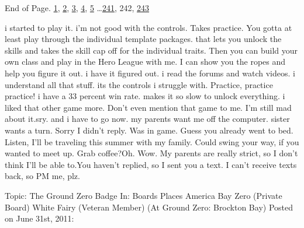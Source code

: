 End of Page.   \underline{1}, \underline{2}, \underline{3}, \underline{4}, \underline{5} \ldots \underline{241}, 242, \underline{243}



\sectionbreak






 i started to play it. i'm not good with the controls. Takes practice.  You gotta at least play through the individual template packages.  that lets you unlock the skills and takes the skill cap off for the individual traits.  Then you can build your own class and play in the Hero League with me.  I can show you the ropes and help you figure it out. i have it figured out.  i read the forums and watch videos.  i understand all that stuff. its the controls i struggle with. Practice, practice practice! i have a 33 percent win rate.  makes it so slow to unlock everything.  i liked that other game more. Don't even mention that game to me.  I'm still mad about it.\strong{ }sry. and i have to go now.  my parents want me off the computer. sister wants a turn.   Sorry I didn't reply.  Was in game.  Guess you already went to bed.  Listen, I'll be traveling this summer with my family.  Could swing your way, if you wanted to meet up.  Grab coffee?Oh.  Wow.  My parents are really strict, so I don't think I'll be able to.You haven't replied, so I sent you a text.  I can't receive texts back, so PM me, plz.



\sectionbreak



\blacklozenge  Topic:  The Ground Zero Badge
In:  Boards \blacktriangleright Places \blacktriangleright America \blacktrianglerightBrockton Bay \blacktrianglerightGround Zero (Private Board)
White Fairy (Veteran Member) (At Ground Zero: Brockton Bay)
Posted on June 31st, 2011:



